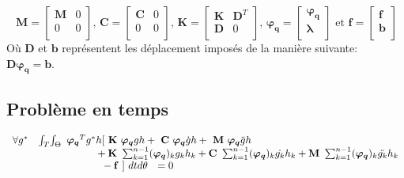 \documentclass[12pt,a4paper]{report}
\begin{document}
\begin{equation}
~\mathbf{M}=
	\begin{bmatrix}
	   \mathbf{M} & 0 \\
	   0 & 0 \\
	\end{bmatrix}
	\textrm{,  }
	\mathbf{C}=
	\begin{bmatrix}
	   \mathbf{C} & 0 \\
	   0 & 0 \\
	\end{bmatrix}
	\textrm{,  } 
	\mathbf{K}=
	\begin{bmatrix}
	   \mathbf{K} & \mathbf{D}^T \\
	   \mathbf{D} & 0 \\
	\end{bmatrix}
	\textrm{,  }
	\boldsymbol{\varphi_q}=
	\begin{bmatrix}
	   \boldsymbol{\varphi_q} \\
	   \boldsymbol{\lambda}\\
	\end{bmatrix}
	\textrm{ et }
	\mathbf{f}=
	\begin{bmatrix}
	   \mathbf{f} \\
	   \mathbf{b} \\
	\end{bmatrix}
\end{equation}
Où $\mathbf{D}$ et $\mathbf{b}$ représentent les déplacement imposés de la manière suivante:
$\mathbf{D} \boldsymbol{\varphi_q}= \mathbf{b}$.

\subsection{Problème en temps}
\begin{equation}
\begin{array}{r r l}
	\forall g^*
	&\int_T \! \int_\Theta \!\!\!&		
		\boldsymbol{\varphi_q}^Tg^*h [~\mathbf{K}~ \boldsymbol{\varphi_q}gh
						+ ~\mathbf{C}~ \boldsymbol{\varphi_q} \dot{g}h 
						+ ~\mathbf{M}~ \boldsymbol{\varphi_q} \ddot{g}h
	\\
	  &&
		\phantom{\boldsymbol{\varphi_q}g^*h
			}+ \mathbf{K}~ \sum_{k=1}^{n-1} (\boldsymbol{\varphi_q})_k       g_k  h_k 
			+  \mathbf{C}~ \sum_{k=1}^{n-1} (\boldsymbol{\varphi_q})_k  \dot{g_k} h_k 
			+  \mathbf{M}~ \sum_{k=1}^{n-1} (\boldsymbol{\varphi_q})_k \ddot{g_k} h_k
	\\
	  &&
		\phantom{\boldsymbol{\varphi_q}^{*T}gh} -\mathbf{f}~] ~dt d\theta ~~=0
\end{array}
\end{equation}
\end{document}

